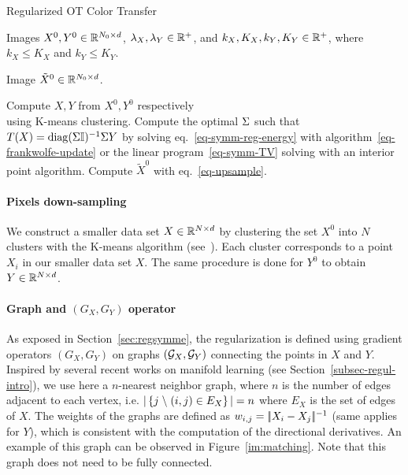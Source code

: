 \begin{algorithm}[ht!]
\caption{Regularized OT Color Transfer}
\label{alg-rot}
\Require Images $X^0,Y^0 \in \mathbb{R}^{N_0 \times d}$, $\lambda_X,\lambda_Y \in \mathbb{R}^+ $, and $k_X,K_X,k_Y,K_Y \in \mathbb{R}^+$, where $k_X \le K_X$ and $k_Y \le K_Y$.

\Ensure Image $\tilde X^0 \in \mathbb{R}^{N_0 \times d}$.
\begin{enumerate}
	 Compute $X,Y$ from $X^0,Y^0$ respectively \\ using K-means clustering.
	 Compute the optimal $\Sigma$ such that  $T(X) = \diag(\Sig \U)^{-1} \Sig Y$ by solving eq.~\eqref{eq-symm-reg-energy} with algorithm~\eqref{eq-frankwolfe-update} or the linear program~\eqref{eq-symm-TV} solving with an interior point algorithm.
	 Compute $\tilde X^0$ with eq.~\eqref{eq-upsample}.
\end{enumerate}
\end{algorithm}


\paragraph{Pixels down-sampling} 

We construct a smaller data set $X \in \mathbb{R}^{N \times d}$ by clustering the set $X^0$ into $N$ clusters with the K-means algorithm (see~\cite{Lloyd57}).
Each cluster corresponds to a point $X_i$ in our smaller data set $X$.  The same procedure is done for $Y^0$ to obtain $Y \in \mathbb{R}^{N \times d}$.%

\paragraph{Graph and $(G_X,G_Y)$ operator} 

As exposed in Section~\ref{sec:regsymme}, the regularization is defined using gradient operators $(G_X,G_Y)$ on graphs $(\mathcal{G}_X,\mathcal{G}_Y)$ connecting the points in $X$ and $Y$. Inspired by several recent works on manifold learning (see Section~\ref{subsec-regul-intro}), we use here a $n$-nearest neighbor graph, where $n$ is the number of edges adjacent to each vertex, i.e. $| \left\{ j \;\backslash\; (i,j) \in E_X \right\} | = n$ where $E_X$ is the set of edges of $X$. The weights of the graphs are defined as $w_{i,j}=|\!| X_i - X_j |\!|^{-1}$ (same applies for $Y$), which is consistent with the computation of the directional derivatives. An example of this graph can be observed in Figure~\ref{im:matching}. Note that this graph does not need to be fully connected. 

